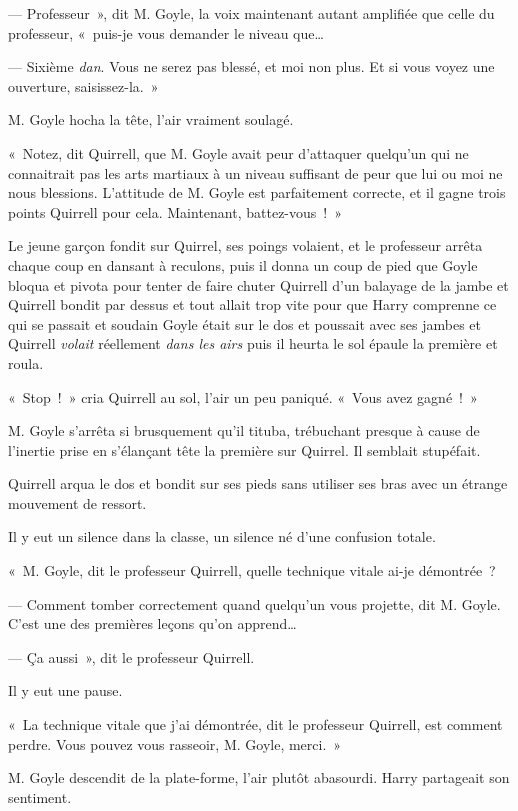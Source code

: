 --- Professeur~», dit M. Goyle, la voix maintenant autant amplifiée que celle du professeur, «~puis-je vous demander le niveau que…

--- Sixième \emph{dan}.
Vous ne serez pas blessé, et moi non plus.
Et si vous voyez une ouverture, saisissez-la.~»

M. Goyle hocha la tête, l'air vraiment soulagé.

«~Notez, dit Quirrell, que M. Goyle avait peur d'attaquer quelqu'un qui ne connaitrait pas les arts martiaux à un niveau suffisant de peur que lui ou moi ne nous blessions.
L'attitude de M. Goyle est parfaitement correcte, et il gagne trois points Quirrell pour cela.
Maintenant, battez-vous~!~»

Le jeune garçon fondit sur Quirrel, ses poings volaient, et le professeur arrêta chaque coup en dansant à reculons, puis il donna un coup de pied que Goyle bloqua et pivota pour tenter de faire chuter Quirrell d'un balayage de la jambe et Quirrell bondit par dessus et tout allait trop vite pour que Harry comprenne ce qui se passait et soudain Goyle était sur le dos et poussait avec ses jambes et Quirrell \emph{volait} réellement \emph{dans les airs} puis il heurta le sol épaule la première et roula.

«~Stop~!~» cria Quirrell au sol, l'air un peu paniqué.
«~Vous avez gagné~!~»

M. Goyle s'arrêta si brusquement qu'il tituba, trébuchant presque à cause de l'inertie prise en s'élançant tête la première sur Quirrel.
Il semblait stupéfait.

Quirrell arqua le dos et bondit sur ses pieds sans utiliser ses bras avec un étrange mouvement de ressort.

Il y eut un silence dans la classe, un silence né d'une confusion totale.

«~M. Goyle, dit le professeur Quirrell, quelle technique vitale ai-je démontrée~?

--- Comment tomber correctement quand quelqu'un vous projette, dit M. Goyle.
C'est une des premières leçons qu'on apprend…

--- Ça aussi~», dit le professeur Quirrell.

Il y eut une pause.

«~La technique vitale que j'ai démontrée, dit le professeur Quirrell, est comment perdre.
Vous pouvez vous rasseoir, M. Goyle, merci.~»

M. Goyle descendit de la plate-forme, l'air plutôt abasourdi.
Harry partageait son sentiment.


